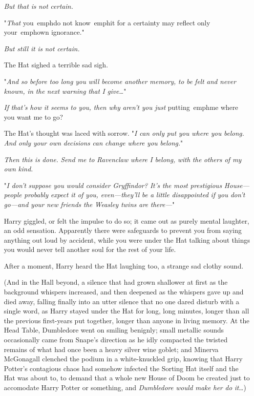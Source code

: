 \emph{But that is not certain.}

"\emph{That} you\ emph{do not} know\ emph{it for a certainty may reflect only} 
your\ emph{own ignorance.}"

\emph{But still it is not certain.}

The Hat sighed a terrible sad sigh.

"\emph{And so before too long you will become another memory, to be felt and 
never known, in the next warning that I give{\ldots}}"

\emph{If that's how it seems to you, then why aren't you just} putting\ emph{me 
where you want me to go?}

The Hat's thought was laced with sorrow. "\emph{I can only put you where you 
belong. And only your own decisions can change where you belong.}"

\emph{Then this is done. Send me to Ravenclaw where I belong, with the others 
of my own kind.}

"\emph{I don't suppose you would consider Gryffindor? It's the most prestigious 
House---people probably expect it of you, even---they'll be a little 
disappointed if you don't go---and your new friends the Weasley twins are 
there---}"

Harry giggled, or felt the impulse to do so; it came out as purely mental 
laughter, an odd sensation. Apparently there were safeguards to prevent you 
from saying anything out loud by accident, while you were under the Hat talking 
about things you would never tell another soul for the rest of your life.

After a moment, Harry heard the Hat laughing too, a strange sad clothy sound.

(And in the Hall beyond, a silence that had grown shallower at first as the 
background whispers increased, and then deepened as the whispers gave up and 
died away, falling finally into an utter silence that no one dared disturb with 
a single word, as Harry stayed under the Hat for long, long minutes, longer 
than all the previous first-years put together, longer than anyone in living 
memory. At the Head Table, Dumbledore went on smiling benignly; small metallic 
sounds occasionally came from Snape's direction as he idly compacted the 
twisted remains of what had once been a heavy silver wine goblet; and Minerva 
McGonagall clenched the podium in a white-knuckled grip, knowing that Harry 
Potter's contagious chaos had somehow infected the Sorting Hat itself and the 
Hat was about to, to demand that a whole new House of Doom be created just to 
accomodate Harry Potter or something, and \emph{Dumbledore would make her do 
it}{\ldots})


